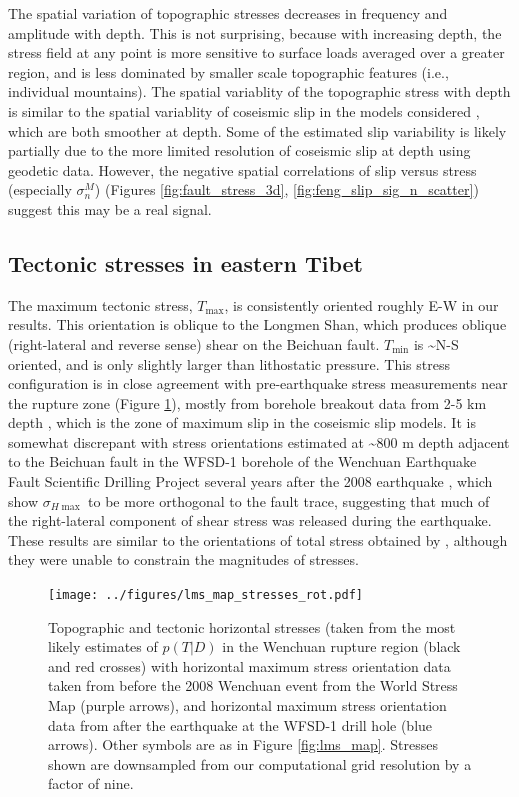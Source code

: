 \documentclass[twocolumn,jgrga]{AGUTeX}
\begin{document}
\begin{article}
{The spatial variation of topographic stresses decreases in frequency and
amplitude with depth. This is not surprising, because with increasing
depth, the stress field at any point is more sensitive to surface loads
averaged over a greater region, and is less dominated by smaller scale
topographic features (i.e., individual mountains). The spatial
variablity of the topographic stress with depth is similar to the spatial
variablity of coseismic slip in the models considered \citep[e.g.,][]
{zhang2011}, which are both smoother at depth. Some of the
estimated slip variability is likely partially due to the more limited
resolution of coseismic slip at depth using geodetic data.
However, the negative spatial correlations of slip versus stress
(especially $\sigma^M_n$) (Figures \ref{fig:fault_stress_3d},
\ref{fig:feng_slip_sig_n_scatter}) suggest this may be a real signal.

\subsection{Tectonic stresses in eastern
Tibet}\label{tectonic-stresses-in-eastern-tibet}

The maximum tectonic stress, $T_{\mathrm{max}}$, is consistently
oriented roughly E-W in our results. This orientation is oblique to the
Longmen Shan, which produces oblique (right-lateral and reverse sense)
shear on the Beichuan fault. $T_{\mathrm{min}}$ is \textasciitilde{}N-S
oriented, and is only slightly larger than lithostatic pressure. This
stress configuration is in close agreement with pre-earthquake stress
measurements near the rupture zone (Figure \ref{fig:lms_stress_map}),
mostly from borehole breakout data from 2-5 km depth
\citep{heidbach2009}, which is the zone of maximum slip in the coseismic
slip models. It is somewhat discrepant with stress orientations
estimated at \textasciitilde{}800 m depth adjacent to the Beichuan fault
in the WFSD-1 borehole of the Wenchuan Earthquake Fault Scientific
Drilling Project several years after the 2008 earthquake \citep{cui2014},
which show $\sigma_{H{\mathrm{\max}}}$ to be more orthogonal to the fault
trace, suggesting that much of the right-lateral component of shear
stress was released during the earthquake. These results are similar to
the orientations of total stress obtained by 
\citet{medinaluna2013}, although they were unable to constrain the
magnitudes of stresses.

\begin{figure}[t]
\centering
\texttt{[image: ../figures/lms\_map\_stresses\_rot.pdf]}
\caption{Topographic and tectonic horizontal stresses (taken from the
most likely estimates of $p(T|D)$ in the Wenchuan rupture region (black
and red crosses) with horizontal maximum stress orientation data taken
from before the 2008 Wenchuan event from the World Stress Map
\citep{heidbach2009} (purple arrows), and horizontal maximum stress
orientation data from after the earthquake at the WFSD-1 drill hole
\citep{cui2014} (blue arrows). Other symbols are as in Figure
\ref{fig:lms_map}. Stresses shown are downsampled from our computational 
grid resolution by a factor of nine.}
\label{fig:lms_stress_map}
\end{figure}

}
\end{article}
\end{document}
